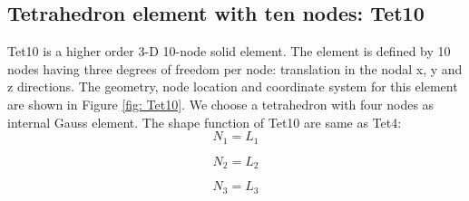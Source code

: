 \subsection{Tetrahedron element with ten nodes: Tet10}
Tet10 is a higher order 3-D 10-node solid element. The element is defined by 10 nodes having three degrees of freedom per node: translation in the nodal x, y and z directions. The geometry, node location and coordinate system for this element are shown in Figure \ref{fig: Tet10}. We choose a tetrahedron with four nodes as internal Gauss element. The shape function of Tet10 are same as Tet4:
\begin{equation}
N_1 = L_1
\end{equation}

\begin{equation}
N_2 = L_2
\end{equation}

\begin{equation}
N_3 = L_3
\end{equation}


